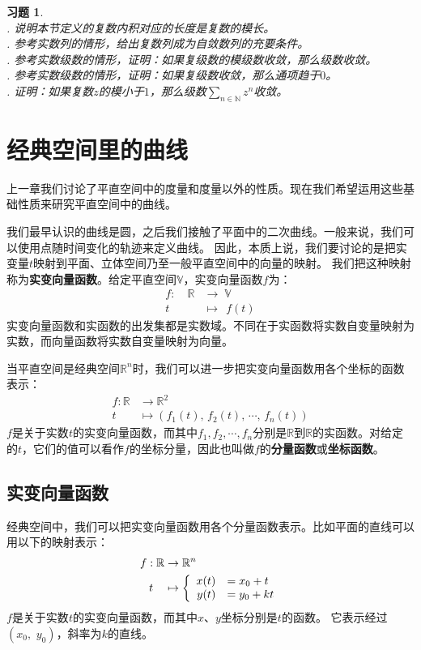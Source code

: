 \documentclass[12pt,UTF8]{ctexbook}
\theoremstyle{definition}
\theoremstyle{plain}
\newtheorem{xt}{习题}[section]
\begin{document}
\begin{xt}
    \mbox{} \\
    . 说明本节定义的复数内积对应的长度是复数的模长。\\
    . 参考实数列的情形，给出复数列成为自敛数列的充要条件。\\ 
    . 参考实数级数的情形，证明：如果复级数的模级数收敛，那么级数收敛。\\
    . 参考实数级数的情形，证明：如果复级数收敛，那么通项趋于$0$。\\
    . 证明：如果复数$z$的模小于$1$，那么级数$\sum_{n\in\mathbb{N}} z^n$收敛。
\end{xt}

\chapter{经典空间里的曲线}

上一章我们讨论了平直空间中的度量和度量以外的性质。现在我们希望运用这些基础性质来研究平直空间中的曲线。

我们最早认识的曲线是圆，之后我们接触了平面中的二次曲线。一般来说，我们可以使用点随时间变化的轨迹来定义曲线。
因此，本质上说，我们要讨论的是把实变量$t$映射到平面、立体空间乃至一般平直空间中的向量的映射。
我们把这种映射称为\textbf{实变向量函数}。给定平直空间$\mathbb{V}$，实变向量函数$f$为：
\begin{align*}
    f: \quad \mathbb{R} &\rightarrow \; \mathbb{V} \\
      t \; &\mapsto \;\,f(t)
\end{align*}
实变向量函数和实函数的出发集都是实数域。不同在于实函数将实数自变量映射为实数，而向量函数将实数自变量映射为向量。

当平直空间是经典空间$\mathbb{R}^n$时，我们可以进一步把实变向量函数用各个坐标的函数表示：
\begin{align*}
    f: \mathbb{R} &\rightarrow \mathbb{R}^2 \\
    t\quad &\mapsto (f_1(t),\, f_2(t),\, \cdots ,\, f_n(t))
\end{align*}
$f$是关于实数$t$的实变向量函数，而其中$f_1,f_2, \cdots, f_n$分别是$\mathbb{R}$到$\mathbb{R}$的实函数。对给定的$t$，它们的值可以看作$f$的坐标分量，因此也叫做$f$的\textbf{分量函数}或\textbf{坐标函数}。

\section{实变向量函数}

经典空间中，我们可以把实变向量函数用各个分量函数表示。比如平面的直线可以用以下的映射表示：
\begin{align*}
    f: \mathbb{R} &\rightarrow \mathbb{R}^n \\
    t\quad &\mapsto\left\{
        \begin{array}[]{rl}
            x(t) &= x_0 + t \\
            y(t) &= y_0 + kt \\
        \end{array}
    \right.
\end{align*}
$f$是关于实数$t$的实变向量函数，而其中$x$、$y$坐标分别是$t$的函数。
它表示经过$(x_0,\,\, y_0)$，斜率为$k$的直线。
\end{document}
